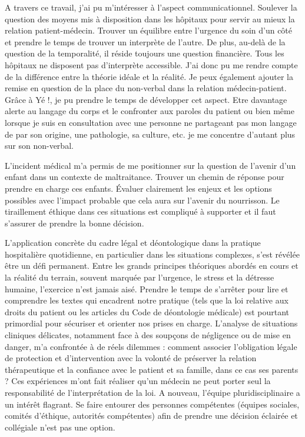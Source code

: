 A travers ce travail, j'ai pu m'intéresser à l'aspect communicationnel. Soulever la question des moyens mis à disposition dans les hôpitaux pour servir au mieux la relation patient-médecin. Trouver un équilibre entre l'urgence du soin d'un côté et prendre le temps de trouver un interprète de l'autre. De plus, au-delà de la question de la temporalité, il réside toujours une question financière. Tous les hôpitaux ne disposent pas d'interprète accessible. J'ai donc pu me rendre compte de la différence entre la théorie idéale et la réalité. Je peux également ajouter la remise en question de la place du non-verbal dans la relation médecin-patient. Grâce à Yé !, je pu prendre le temps de développer cet aspect. Etre davantage alerte au langage du corps et le confronter aux paroles du patient ou bien même lorsque je suis en consultation avec une personne ne partageant pas mon langage de par son origine, une pathologie, sa culture, etc. je me concentre d'autant plus sur son non-verbal.

L'incident médical m'a permis de me positionner sur la question de l'avenir d'un enfant dans un contexte de maltraitance. Trouver un chemin de réponse pour prendre en charge ces enfants. Évaluer clairement les enjeux et les options possibles avec l'impact probable que cela aura sur l'avenir du nourrisson. Le tiraillement éthique dans ces situations est compliqué à supporter et il faut s'assurer de prendre la bonne décision.

L'application concrète du cadre légal et déontologique dans la pratique hospitalière quotidienne, en particulier dans les situations complexes, s'est révélée être un défi permanent. Entre les grands principes théoriques abordés en cours et la réalité du terrain, souvent marquée par l'urgence, le stress et la détresse humaine, l'exercice n'est jamais aisé. Prendre le temps de s'arrêter pour lire et comprendre les textes qui encadrent notre pratique (tels que la loi relative aux droits du patient ou les articles du Code de déontologie médicale) est pourtant primordial pour sécuriser et orienter nos prises en charge. L'analyse de situations cliniques délicates, notamment face à des soupçons de négligence ou de mise en danger, m'a confrontée à de réels dilemmes : comment associer l'obligation légale de protection et d'intervention avec la volonté de préserver la relation thérapeutique et la confiance avec le patient et sa famille, dans ce cas ses parents ? Ces expériences m'ont fait réaliser qu'un médecin ne peut porter seul la responsabilité de l'interprétation de la loi. A nouveau, l'équipe pluridisciplinaire a un intérêt flagrant. Se faire entourer des personnes compétentes (équipes sociales, comités d'éthique, autorités compétentes) afin de prendre une décision éclairée et collégiale n'est pas une option. 

